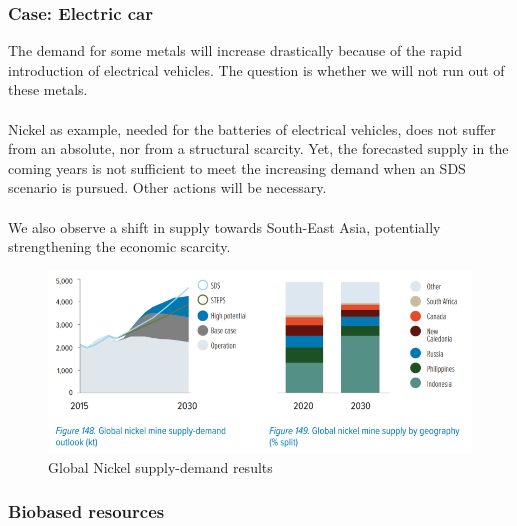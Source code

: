 \documentclass[../summary.tex]{subfiles}
\begin{document}
\subsubsection{Case: Electric car}

The demand for some metals will increase drastically because of the rapid introduction of electrical vehicles. The question is whether we will not run out of these metals.\\
\\
Nickel as example, needed for the batteries of electrical vehicles, does not suffer from an absolute, nor from a structural scarcity. Yet, the forecasted supply in the coming years is not sufficient to meet the increasing demand when an SDS scenario is pursued. Other actions will be necessary.\\
\\
We also observe a shift in supply towards South-East Asia, potentially strengthening the economic scarcity.

\begin{figure}[H]
	\centering
	\includegraphics[width=0.8\linewidth]{../images/Global_nickel_supply-demand}
	\caption{Global Nickel supply-demand results}
	\label{fig:globalnickelsupply-demand}
\end{figure}

\subsubsection{Biobased resources}
\end{document}
